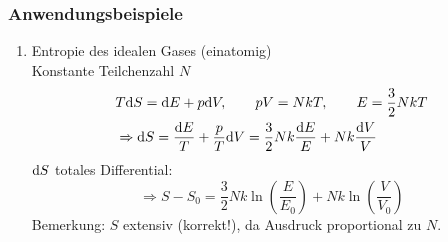 \subsubsection{Anwendungsbeispiele}
\begin{enumerate}
    \item Entropie des idealen Gases (einatomig) \\
    Konstante Teilchenzahl $N$
    \begin{equation}
        \begin{split}
            & T \mathrm{d} S = \mathrm{d} E + p \mathrm{d} V, \qquad p V = N k T, \qquad E = \frac{3}{2} N k T \\
            & \Rightarrow \mathrm{d} S = \frac{\mathrm{d} E}{T} + \frac{p}{T} \mathrm{d} V = \frac{3}{2} N k \frac{\mathrm{d} E}{E} + N k \frac{\mathrm{d} V}{V}
        \end{split}
    \end{equation}
    $\mathrm{d} S$ totales Differential:
    \begin{equation}
        \Rightarrow S - S_0 = \frac{3}{2} N k \ln (\frac{E}{E_0}) + N k \ln (\frac{V}{V_0})
    \end{equation}
    Bemerkung: $S$ extensiv (korrekt!), da Ausdruck proportional zu $N$.

\end{enumerate}
